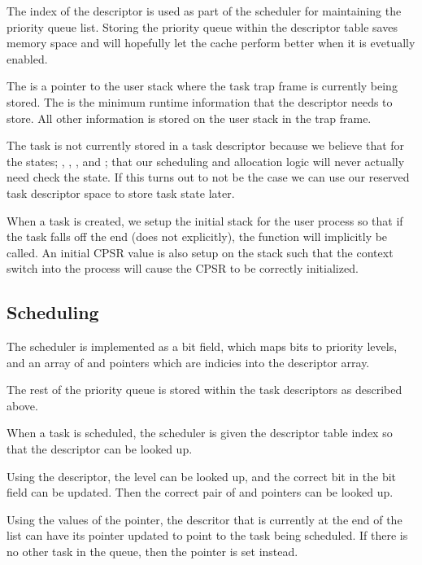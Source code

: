 \documentclass[pdftex,10pt,a4paper]{article}
\begin{document}
The  index of the descriptor is used as part of the
scheduler for maintaining the priority queue list. Storing the
priority queue within the descriptor table saves memory space
and will hopefully let the cache perform better when it is evetually
enabled.

The  is a pointer to the user stack where the task trap frame
is currently being stored. The  is the minimum runtime
information that the descriptor needs to store. All other information
is stored on the user stack in the trap frame.

The task  is not currently stored in a task descriptor
because we believe that for the states; , ,
, and ; that our scheduling and allocation
logic will never actually need check the state. If this turns out to
not be the case we can use our reserved task descriptor space to store
task state later.

When a task is created, we setup the initial stack for the user
process so that if the task falls off the end (does not 
explicitly), the  function will implicitly be called. An
initial CPSR value is also setup on the stack such that the context
switch into the process will cause the CPSR to be correctly
initialized.

\subsection*{Scheduling}

The scheduler is implemented as a bit field, which maps bits to
priority levels, and an array of  and  pointers
which are indicies into the descriptor array.

The rest of the priority queue is stored within the task descriptors
as described above.

When a task is scheduled, the scheduler is given the descriptor table
index so that the descriptor can be looked up.

Using the descriptor, the  level can be looked up, and
the correct bit in the bit field can be updated. Then the correct pair
of  and  pointers can be looked up.

Using the values of the  pointer, the descritor that is
currently at the end of the list can have its  pointer
updated to point to the task being scheduled. If there is no other
task in the queue, then the  pointer is set instead.
\end{document}
